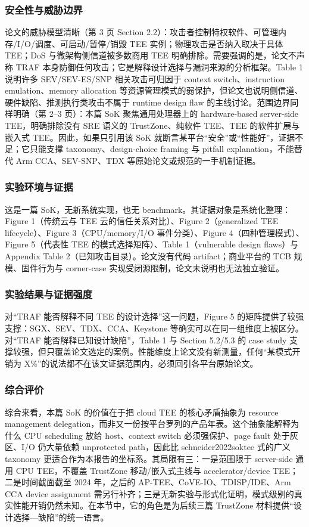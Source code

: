 \documentclass[11pt]{ctexart}
\begin{document}
\subsubsection{安全性与威胁边界}
论文的威胁模型清晰（第 3 页 Section 2.2）：攻击者控制特权软件、可管理内存/I/O/调度、可启动/暂停/销毁 TEE 实例；物理攻击是否纳入取决于具体 TEE；DoS 与微架构侧信道被多数商用 TEE 明确排除。需要强调的是，论文不声称 TRAF 本身防御任何攻击；它是解释设计选择与漏洞来源的分析框架。Table 1 说明许多 SEV/SEV-ES/SNP 相关攻击可归因于 context switch、instruction emulation、memory allocation 等资源管理模式的弱保护，但论文也说明侧信道、硬件缺陷、推测执行类攻击不属于 runtime design flaw 的主线讨论。范围边界同样明确（第 2--3 页）：本篇 SoK 聚焦通用处理器上的 hardware-based server-side TEE，明确排除没有 SRE 语义的 TrustZone、纯软件 TEE、TEE 的软件扩展与嵌入式 TEE。因此，如果只引用该 SoK 就断言某平台``安全''或``性能好''，证据不足；它只能支撑 taxonomy、design-choice framing 与 pitfall explanation，不能替代 Arm CCA、SEV-SNP、TDX 等原始论文或规范的一手机制证据。\par
\subsubsection{实验环境与证据}
这是一篇 SoK，无新系统实现，也无 benchmark。其证据对象是系统化整理：Figure 1（传统云与 TEE 云的信任关系对比）、Figure 2（generalized TEE lifecycle）、Figure 3（CPU/memory/I/O 事件分类）、Figure 4（四种管理模式）、Figure 5（代表性 TEE 的模式选择矩阵）、Table 1（vulnerable design flaws）与 Appendix Table 2（已知攻击目录）。论文没有代码 artifact；商业平台的 TCB 规模、固件行为与 corner-case 实现受闭源限制，论文未说明也无法独立验证。\par
\subsubsection{实验结果与证据强度}
对``TRAF 能否解释不同 TEE 的设计选择''这一问题，Figure 5 的矩阵提供了较强支撑：SGX、SEV、TDX、CCA、Keystone 等确实可以在同一组维度上被区分。对``TRAF 能否解释已知设计缺陷''，Table 1 与 Section 5.2/5.3 的 case study 支撑较强，但只覆盖论文选定的案例。性能维度上论文没有新测量，任何``某模式开销为 X\%''的说法都不在该文证据范围内，必须回引各平台原始论文。\par
\subsubsection{综合评价}
综合来看，本篇 SoK 的价值在于把 cloud TEE 的核心矛盾抽象为 resource management delegation，而非又一份按平台罗列的产品年表。这个抽象能解释为什么 CPU scheduling 放给 host、context switch 必须强保护、page fault 处于灰区、I/O 仍大量依赖 unprotected path，因此比 schneider2022soktee 式的广义 taxonomy 更适合作为本报告的坐标系。其局限有三：一是范围限于 server-side 通用 CPU TEE，不覆盖 TrustZone 移动/嵌入式主线与 accelerator/device TEE；二是时间截面截至 2024 年，之后的 AP-TEE、CoVE-IO、TDISP/IDE、Arm CCA device assignment 需另行补齐；三是无新实验与形式化证明，模式级别的真实性能开销仍然未知。在本节中，它的角色是为后续三篇 TrustZone 材料提供``设计选择—缺陷''的统一语言。\par
\end{document}

